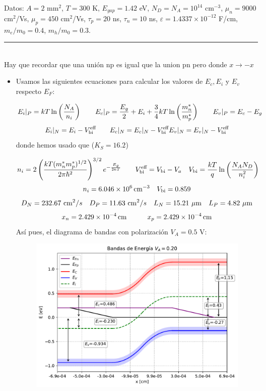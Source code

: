 Datos: $A = 2$ mm$^2$, $T = 300$ K, $E_{gap} = 1.42$ eV, $N_D = N_A = 10^{14}$ cm$^{-3}$, $\mu_n = 9000$ cm$^2$/Vs, $\mu_p = 450$ cm$^2$/Vs, $\tau_p = 20$ ns, $\tau_n = 10$ ns, $\varepsilon = 1.4337 \times 10^{-12}$ F/cm, $m_e/m_0 = 0.4$, $m_h/m_0 = 0.3$.


\rule{\textwidth}{0.1pt} \\[2pt]


Hay que recordar que una unión np es igual que la union pn pero donde $x\rightarrow -x$
\begin{itemize}
    \item Usamos las siguientes ecuaciones para calcular los valores de $E_c,E_i$ y $E_v$ respecto $E_F$: 
    
    \begin{equation*}
        E_i|_P =  k T \ln \left( \frac{N_A}{n_i} \right) \qquad E_c|_P = \frac{E_g}{2} + E_i + \frac{3}{4} kT \ln \left( \frac{m_n^*}{m_p^*} \right) \qquad E_v |_P = E_c - E_g
    \end{equation*}
    \begin{equation*}
        E_i|_N = E_i - V_{\text{bi}}^\text{eff}  \qquad E_c|_N = E_c|_N - V_{\text{bi}}^\text{eff} E_v |_N = E_v|_N - V_{\text{bi}}^\text{eff} 
    \end{equation*}
    donde hemos usado que ($K_S=16.2$)

    \begin{equation*}
        n_i = 2 \left( \frac{kT (m_n^* m_p^* )^{1/2}}{2\pi \hbar^2} \right)^{3/2} e^{-\frac{E_g}{2kT}} 
    \qquad V_{\text{bi}}^{\text{eff}} = V_{\text{bi}} - V_a \quad V_{\text{bi}} = \frac{kT}{q} \ln \left( \frac{N_AN_D}{n_i^2} \right)
    \end{equation*}
    \begin{equation}
        n_i=\SI{6.046e+6}{cm^{-3}} \quad V_{\text{bi}} = 0.859 
    \end{equation}
    \begin{equation}
        D_N = 232.67 \ \cm^2/s \quad D_P =  11.63 \ \cm^2/s \quad L_N = 15.21 \ \mu \unit{m} \quad L_P = 4.82 \  \mu \unit{m}
    \end{equation}
    \begin{equation}
        x_n = \SI{2.429e-4}{cm} \quad \quad \quad 
        x_p = \SI{2.429e-4}{cm}  
    \end{equation}
    Así pues, el diagrama de bandas con polarización $V_A=0.5$ V: 

    \begin{figure}[h!] \centering
        \includegraphics[width=0.6\linewidth]{Cuerpo/Ch_03/03_06_01.pdf}
    \end{figure}
    


\end{itemize}
